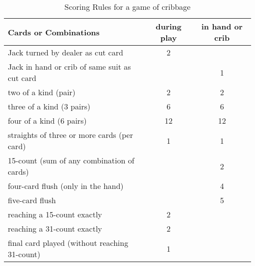 
%

\begin{table}[h]
\begin{tabular}{l|c|c}
	\textbf{Cards or Combinations} & \textbf{during play} & \textbf{in hand or
	crib} \\ \hline
	Jack turned by dealer as cut card & 2 & \textemdash \\
	Jack in hand or crib of same suit as cut card & \textemdash & 1 \\
	two of a kind (pair) & 2 & 2 \\
	three of a kind (3 pairs) & 6 & 6 \\
	four of a kind (6 pairs) & 12 & 12 \\
	straights of three or more cards (per card) & 1 & 1 \\
	15-count (sum of any combination of cards) & \textemdash & 2 \\
	four-card flush (only in the hand) & \textemdash & 4 \\
	five-card flush & \textemdash & 5 \\
	reaching a 15-count exactly & 2 & \textemdash \\
	reaching a 31-count exactly & 2 & \textemdash \\
	final card played (without reaching 31-count) & 1 & \textemdash
\end{tabular}
\caption{Scoring Rules for a game of cribbage \cite{ACC_rulebook}}
\label{tab:app-score-rules}
\end{table}
